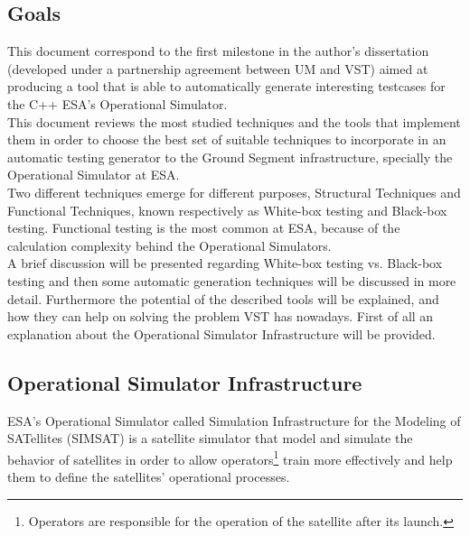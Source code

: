 \documentclass[a4paper,UKenglish]{oasics}
\begin{document}
\subsection{Goals}
This document correspond to the first milestone in the author's dissertation (developed under a partnership agreement between UM and VST) aimed at producing a tool
that is able to automatically generate interesting testcases for the C++ ESA's Operational Simulator.\\
This document reviews the most studied techniques
and the tools that implement them in order to choose the best set of
suitable techniques to incorporate in an automatic
testing generator to the Ground Segment infrastructure, specially the
Operational Simulator at ESA.\\
Two different techniques emerge for different purposes, Structural
Techniques and Functional Techniques,
known respectively as White-box\cite{stt} testing and Black-box\cite{black} testing.
Functional testing is the most common at ESA, because of the
calculation complexity behind the Operational Simulators.\\
A brief discussion will be presented regarding White-box testing vs. Black-box
testing and then some automatic generation techniques will be discussed in more detail.
Furthermore the potential of the described tools will be explained, and how they can help
on solving the problem VST has nowadays. First of all an explanation about the Operational Simulator Infrastructure will be provided.

\subsection{Operational Simulator Infrastructure}
ESA's Operational Simulator called Simulation Infrastructure for the Modeling of SATellites (SIMSAT) is a satellite simulator that model and simulate
the behavior of satellites in order to allow operators\footnote{Operators are responsible for the operation of the satellite after its launch.} train more effectively 
and help them to define the satellites' operational processes.
\end{document}

